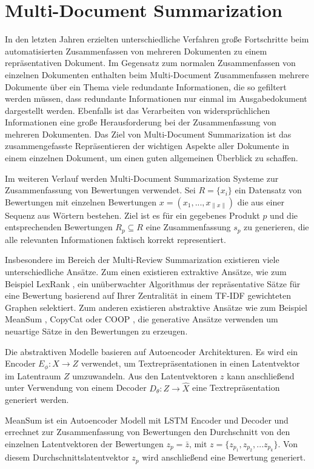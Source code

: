 \section{Multi-Document Summarization}
In den letzten Jahren erzielten unterschiedliche Verfahren große Fortschritte beim automatisierten Zusammenfassen von mehreren Dokumenten zu einem repräsentativen Dokument.
Im Gegensatz zum normalen Zusammenfassen von einzelnen Dokumenten enthalten beim Multi-Document Zusammenfassen mehrere Dokumente über ein Thema viele redundante Informationen, die so gefiltert werden müssen, dass redundante Informationen nur einmal im Ausgabedokument dargestellt werden.
Ebenfalls ist das Verarbeiten von widersprüchlichen Informationen eine große Herausforderung bei der Zusammenfassung von mehreren Dokumenten.
Das Ziel von Multi-Document Summarization ist das zusammengefasste Repräsentieren der wichtigen Aspekte aller Dokumente in einem einzelnen Dokument, um einen guten allgemeinen Überblick zu schaffen.

Im weiteren Verlauf werden Multi-Document Summarization Systeme zur Zusammenfassung von Bewertungen verwendet.
Sei $R= \{x_i \}$ ein Datensatz von Bewertungen mit einzelnen Bewertungen $x=(x_1,...,x_{\| x \|})$ die aus einer Sequenz aus Wörtern bestehen.
Ziel ist es für ein gegebenes Produkt $p$ und die entsprechenden Bewertungen $R_p \subseteq R$ eine Zusammenfassung $s_p$ zu generieren, die alle relevanten Informationen faktisch korrekt representiert.


Insbesondere im Bereich der Multi-Review Summarization existieren viele unterschiedliche Ansätze.
Zum einen existieren extraktive Ansätze, wie zum Beispiel LexRank \citep{lexrank}, ein unüberwachter Algorithmus der repräsentative Sätze für eine Bewertung basierend auf Ihrer Zentralität in einem TF-IDF gewichteten Graphen selektiert.
Zum anderen existieren abstraktive Ansätze wie zum Beispiel MeanSum \citep{meansum}, CopyCat \citep{copycat} oder COOP \citep{coop}, die generative Ansätze verwenden um neuartige Sätze in den Bewertungen zu erzeugen.

Die abstraktiven Modelle basieren auf Autoencoder Architekturen. Es wird ein Encoder $E_\phi : X \rightarrow Z$ verwendet, um Textrepräsentationen in einen Latentvektor im Latentraum $Z$ umzuwandeln.
Aus den Latentvektoren $z$ kann anschließend unter Verwendung von einem Decoder $D_\theta : Z \rightarrow \hat{X}$ eine Textrepräsentation generiert werden.


MeanSum ist ein Autoencoder Modell \citep{meansum} mit LSTM Encoder und Decoder und errechnet zur Zusammenfassung von Bewertungen den Durchschnitt von den einzelnen Latentvektoren der Bewertungen $z_p = \bar{z} \text{, mit } z=\{z_{p_1},z_{p_2},...z_{p_k}\}$.
Von diesem Durchschnittslatentvektor $z_p$ wird anschließend eine Bewertung generiert. 



